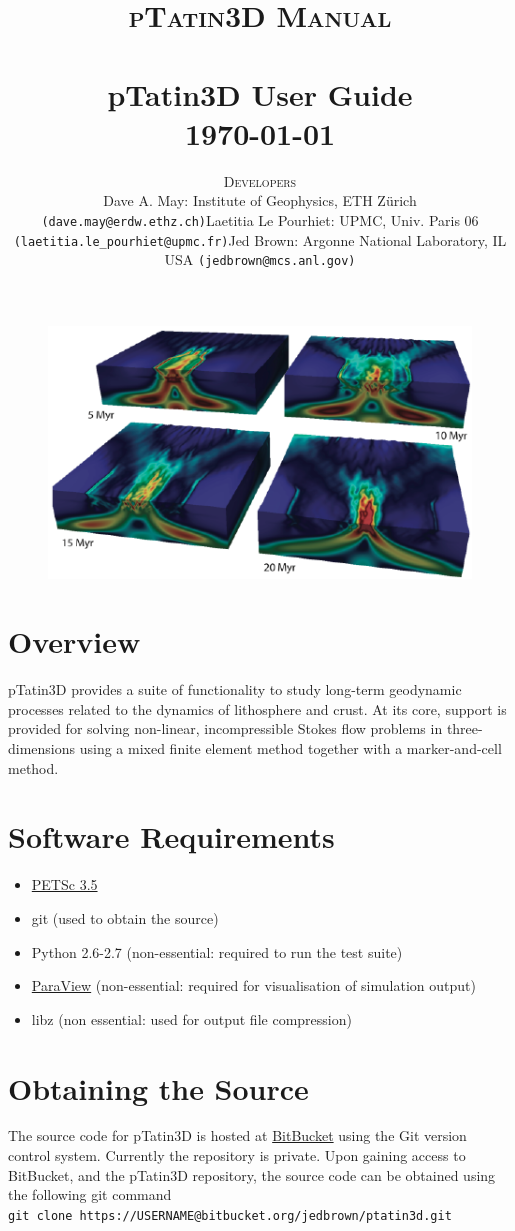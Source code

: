 \documentclass[paper=a4, fontsize=11pt,twoside]{scrartcl}
\title{	\normalsize \textsc{pTatin3D Manual} 	%
	\\[2.0cm]									%
	\HRule{2pt} \\ [0.3cm]						%
	\LARGE \textbf{{pTatin3D User Guide}}			%
	\HRule{2pt} \\ [0.5cm]						%
	\normalsize \today							%
	}
\author{
{\normalsize \textsc{Developers}}
\begin{itemize}
\item[-] Dave A. May: Institute of Geophysics, ETH Z{\"u}rich \texttt{(dave.may@erdw.ethz.ch)} 
\item[-] Laetitia Le Pourhiet: UPMC, Univ. Paris 06  \texttt{(laetitia.le\_pourhiet@upmc.fr)}
\item[-] Jed Brown: Argonne National Laboratory, IL USA  \texttt{(jedbrown@mcs.anl.gov)}
\end{itemize}
}
\makeatletter
\newcommand{\ptat}{{{\sc pTatin3D}}}
\newcommand{\shellcmd}[1]{\\\indent\indent\texttt{\hspace{5mm}\footnotesize #1}\\}
\def\printtitle{%
    {
    	\centering \@title\par}
		 	\vspace{10mm}
	\begin{figure} [hbtp]
	\includegraphics[height=0.4\textheight]{figs/ptat3d_front_page_small.pdf}
	\end{figure}
    }
\def\printauthor{%
    {\centering \large \@author}}
\makeatother
\begin{document}
\thispagestyle{empty}%

\printtitle%
  	\vfill
\printauthor%




\newpage
{}
\tableofcontents{}

\newpage


\section{Overview}
{\ptat} provides a suite of functionality to study long-term geodynamic processes related to the dynamics of lithosphere and crust.
At its core, support is provided for solving non-linear, incompressible Stokes flow problems in three-dimensions using a mixed finite element method together with a marker-and-cell method.




\newpage
\section{Software Requirements}
\begin{itemize}
	\item \href{http://www.mcs.anl.gov/petsc}{PETSc 3.5}
	\item git (used to obtain the source)
	\item Python 2.6-2.7 (non-essential: required to run the test suite)
	\item \href{www.paraview.org}{ParaView} (non-essential: required for visualisation of simulation output)
	\item libz (non essential: used for output file compression)
\end{itemize}

\section{Obtaining the Source}
The source code for {\ptat} is hosted at \href{https://bitbucket.org}{BitBucket} using the Git version control system.
Currently the repository is private. Upon gaining access to BitBucket, and the {\ptat} repository,
the source code can be obtained using the following git command
\shellcmd{git clone https://USERNAME@bitbucket.org/jedbrown/ptatin3d.git}
\end{document}
